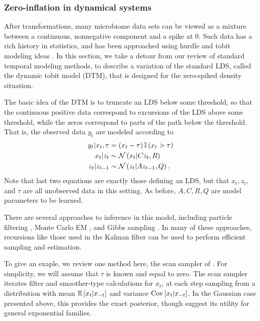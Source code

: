\documentclass[14pt]{extreport}
\begin{document}
\subsubsection{Zero-inflation in dynamical systems}
\label{subsubsec:zero_inflation_dynamical}

After transformations, many microbiome data sets can be viewed as a mixture
between a continuous, nonnegative component and a spike at 0. Such data has a
rich history in statistics, and has been approached using hurdle and tobit
modeling ideas \citep{min2002modeling}. In this section, we take a detour from
our review of standard temporal modeling methods, to describe a variation of the
standard LDS, called the dynamic tobit model (DTM), that is designed for the
zero-spiked density situation.

The basic idea of the DTM is to truncate an LDS below some threshold, so that
the continuous positive data correspond to excursions of the LDS above some
threshold, while the zeros correspond to parts of the path below the threshold.
That is, the observed data $y_t$ are modeled according to
\begin{align*}
  y_{t} \vert x_t, \tau &= \left(x_t - \tau\right)\mathbb{I}\left({x_t > \tau}\right)  \\
  x_t \vert z_t &\sim \mathcal{N}\left(x_t \vert C z_{t}, R\right) \\
  z_t \vert z_{t - 1} &\sim \mathcal{N}\left(z_t \vert A z_{t - 1}, Q\right).
\end{align*}
Note that last two equations are exactly those defining an LDS, but that $x_t,
z_t$, and $\tau$ are all unobserved data in this setting. As before, $A, C, R,
Q$ are model parameters to be learned.

There are several approaches to inference in this model, including particle
filtering \citep{doucet2000rao}, Monte Carlo EM \citep{manrique1998simulation},
and Gibbs sampling \citep{de1997scan, wei1999bayesian}. In many of these
approaches, recursions like those used in the Kalman filter can be used to
perform efficient sampling and estimation.

To give an exaple, we review one method here, the scan sampler of
\citep{de1997scan}. For simplicity, we will assume that $\tau$ is known and
equal to zero. The scan sampler iterates filter and smoother-type calculations
for $x_t$, at each step sampling from a distribution with mean $\mathbb{E}\left[{x_t \vert
  x_{-t}}\right]$ and variance $\mathrm{Cov}\left[{x_t \vert x_{-t}}\right]$. In the Gaussian case
presented above, this provides the exact posterior, though \cite{de1997scan}
suggest its utility for general exponential families.
\end{document}
